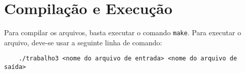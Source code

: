 \section{Compilação e Execução}
	Para compilar os arquivos, basta executar o comando \texttt{make}. Para
executar o arquivo, deve-se usar a seguinte linha de comando:
\begin{verbatim}
	./trabalho3 <nome do arquivo de entrada> <nome do arquivo de saída>
\end{verbatim}

